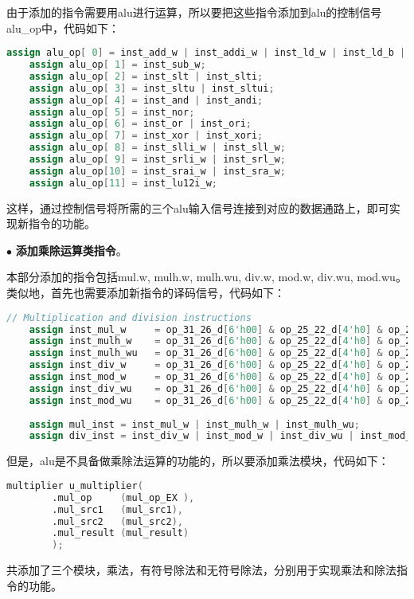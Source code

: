 \documentclass[11pt]{article}
\begin{document}
由于添加的指令需要用alu进行运算，所以要把这些指令添加到alu的控制信号alu_op中，代码如下：
\begin{lstlisting}[language=Verilog]
    assign alu_op[ 0] = inst_add_w | inst_addi_w | inst_ld_w | inst_ld_b | inst_ld_h | inst_ld_bu | inst_ld_hu | inst_st_w | inst_st_b | inst_st_h | inst_jirl | inst_bl | inst_pcaddu12i; // exp11: add branch instructions
    assign alu_op[ 1] = inst_sub_w;
    assign alu_op[ 2] = inst_slt | inst_slti;
    assign alu_op[ 3] = inst_sltu | inst_sltui;
    assign alu_op[ 4] = inst_and | inst_andi;
    assign alu_op[ 5] = inst_nor;
    assign alu_op[ 6] = inst_or | inst_ori;
    assign alu_op[ 7] = inst_xor | inst_xori;
    assign alu_op[ 8] = inst_slli_w | inst_sll_w;
    assign alu_op[ 9] = inst_srli_w | inst_srl_w;
    assign alu_op[10] = inst_srai_w | inst_sra_w;
    assign alu_op[11] = inst_lu12i_w;
\end{lstlisting}
这样，通过控制信号将所需的三个alu输入信号连接到对应的数据通路上，即可实现新指令的功能。

\noindent
$\bullet$
\textbf{添加乘除运算类指令}。

本部分添加的指令包括mul.w, mulh.w, mulh.wu, div.w, mod.w, div.wu, mod.wu。
类似地，首先也需要添加新指令的译码信号，代码如下：
\begin{lstlisting}[language=Verilog]
    // Multiplication and division instructions
    assign inst_mul_w     = op_31_26_d[6'h00] & op_25_22_d[4'h0] & op_21_20_d[2'h1] & op_19_15_d[5'h18];
    assign inst_mulh_w    = op_31_26_d[6'h00] & op_25_22_d[4'h0] & op_21_20_d[2'h1] & op_19_15_d[5'h19];
    assign inst_mulh_wu   = op_31_26_d[6'h00] & op_25_22_d[4'h0] & op_21_20_d[2'h1] & op_19_15_d[5'h1a];
    assign inst_div_w     = op_31_26_d[6'h00] & op_25_22_d[4'h0] & op_21_20_d[2'h2] & op_19_15_d[5'h00];
    assign inst_mod_w     = op_31_26_d[6'h00] & op_25_22_d[4'h0] & op_21_20_d[2'h2] & op_19_15_d[5'h01];
    assign inst_div_wu    = op_31_26_d[6'h00] & op_25_22_d[4'h0] & op_21_20_d[2'h2] & op_19_15_d[5'h02];
    assign inst_mod_wu    = op_31_26_d[6'h00] & op_25_22_d[4'h0] & op_21_20_d[2'h2] & op_19_15_d[5'h03];
    
    assign mul_inst = inst_mul_w | inst_mulh_w | inst_mulh_wu;
    assign div_inst = inst_div_w | inst_mod_w | inst_div_wu | inst_mod_wu;
\end{lstlisting}

但是，alu是不具备做乘除法运算的功能的，所以要添加乘法模块，代码如下：
\begin{lstlisting}[language=Verilog]
    multiplier u_multiplier(
        .mul_op     (mul_op_EX ),
        .mul_src1   (mul_src1),
        .mul_src2   (mul_src2),
        .mul_result (mul_result)
        );
\end{lstlisting}
共添加了三个模块，乘法，有符号除法和无符号除法，分别用于实现乘法和除法指令的功能。
\end{document}
